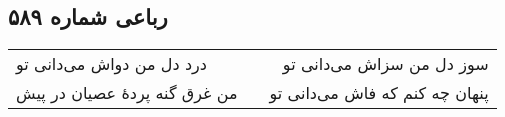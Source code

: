\begin{center}
\section*{رباعی شماره ۵۸۹}
\label{sec:sh589}
\begin{longtable}{l p{0.5cm} r}
درد دل من دواش می‌دانی تو
&&
سوز دل من سزاش می‌دانی تو
\\
من غرق گنه پردهٔ عصیان در پیش
&&
پنهان چه کنم که فاش می‌دانی تو
\\
\end{longtable}
\end{center}
